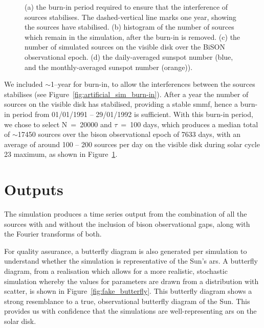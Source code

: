 \begin{figure}[!ht]
	\caption{(a) the burn-in period required to ensure that the interference of sources stabilises. The dashed-vertical line marks one year, showing the sources have stabilised. (b) histogram of the number of sources which remain in the simulation, after the burn-in is removed. (c) the number of simulated sources on the visible disk over the BiSON observational epoch. (d) the daily-averaged sunspot number (blue, and the monthly-averaged sunspot number (orange)).}
	\label{fig:artificial_sim_config}
\end{figure}


We included $\sim$1--year for burn-in, to allow the interferences between the sources stabilises (see Figure~\ref{fig:artificial_sim_burn-in}). After a year the number of sources on the visible disk has stabilised, providing a stable \gls{smmf}, hence a burn-in period from 01/01/1991 -- 29/01/1992 is sufficient. With this burn-in period, we chose to select N~=~20000 and $\tau$~=~100 days, which produces a median total of $\sim$17450 sources over the \gls{bison} observational epoch of 7633 days, with an average of around 100 -- 200 sources per day on the visible disk during solar cycle 23 maximum, as shown in Figure~\ref{fig:artificial_sim_config}.




\section{Outputs}


The simulation produces a time series output from the combination of all the sources with and without the inclusion of \gls{bison} observational gaps, along with the Fourier transforms of both. 

For quality assurance, a butterfly diagram is also generated per simulation to understand whether the simulation is representative of the Sun's \glspl{ar}. A butterfly diagram, from a realisation which allows for a more realistic, stochastic simulation whereby the values for parameters are drawn from a distribution with scatter, is shown in Figure~\ref{fig:fake_butterfly}. This butterfly diagram shows a strong resemblance to a true, observational butterfly diagram of the Sun. This provides us with confidence that the simulations are well-representing \glspl{ar} on the solar disk.


